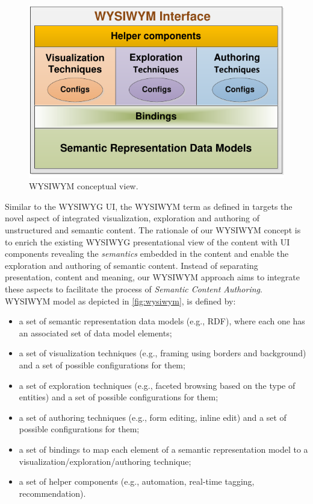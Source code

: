 \documentclass[journal]{IEEEtran}
\begin{document}
\begin{figure}[tb]
	\centering
		\includegraphics[width=1.0\columnwidth]{images/model.pdf}
	\caption{WYSIWYM conceptual view.}
	\label{fig:wysiwym}
\end{figure}

Similar to the WYSIWYG UI, the WYSIWYM term as defined in \cite{khaliliWISE2013} targets the novel aspect of integrated visualization, exploration and authoring of unstructured and semantic content.
The rationale of our WYSIWYM concept is to enrich the existing WYSIWYG presentational view of the content with UI components revealing the \emph{semantics} embedded in the content and enable the exploration and authoring of semantic content.
Instead of separating presentation, content and meaning, our WYSIWYM approach aims to integrate these aspects to facilitate the process of \emph{Semantic Content Authoring}.\\

WYSIWYM model as depicted in \autoref{fig:wysiwym}, is defined by:
\begin{itemize}
	\item a set of semantic representation data models (e.g., RDF), where each one has an associated set of data model elements;
	\item a set of visualization techniques (e.g., framing using borders and background) and a set of possible configurations for them;
	\item a set of exploration techniques (e.g., faceted browsing based on the type of entities) and a set of possible configurations for them;
	\item a set of authoring techniques (e.g., form editing, inline edit) and a set of possible configurations for them;
	\item a set of bindings to map each element of a semantic representation model to a visualization/exploration/authoring technique;
	\item a set of helper components (e.g., automation, real-time tagging, recommendation).\\
\end{itemize}
\end{document}
